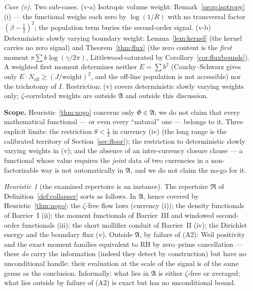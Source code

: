 \documentclass[11pt]{amsart}
\theoremstyle{plain}
\theoremstyle{definition}
\theoremstyle{remark}
\newtheorem{heuristic}[theorem]{Heuristic}
\newcommand{\RH}{\mathrm{RH}}
\begin{document}
\emph{Case \textup{(v)}.} Two sub-cases. \textup{(v-a)} Isotropic volume weight: Remark~\ref{prop:isotropy}(i) --- the functional weighs each zero by $\log(1/R)$ with no transversal factor $(\beta-\tfrac12)^2$; the population term buries the second-order signal. \textup{(v-b)} Deterministic slowly varying boundary weight: Lemma~\ref{lem:kernel} (the kernel carries no zero signal) and Theorem~\ref{thm:flux} (the zero content is the \emph{first} moment $\pi\sum b\log(\gamma/2\pi)$, Littlewood-saturated by Corollary~\ref{cor:fluxbounds}). A weighted first moment determines neither $E=\sum b^2$ (Cauchy--Schwarz gives only $E\cdot N_{\mathrm{off}}\ge(J/\text{weight})^2$, and the off-line population is not accessible) nor the trichotomy of $I$. Restriction: \textup{(v)} covers deterministic slowly varying weights only; $\zeta$-correlated weights are outside $\mathfrak A$ and outside this discussion.

\textbf{Scope.} Heuristic~\ref{thm:nogo} concerns only $\Phi\in\mathfrak A$; we do not claim that every mathematical functional --- or even every ``natural'' one --- belongs to it. Three explicit limits: the restriction $\theta<\tfrac12$ in currency \textup{(iv)} (the long range is the calibrated territory of Section~\ref{sec:floor}); the restriction to deterministic slowly varying weights in \textup{(v)}; and the absence of an inter-currency closure clause --- a functional whose value requires the \emph{joint} data of two currencies in a non-factorizable way is not automatically in $\mathfrak A$, and we do not claim the no-go for it.

\begin{heuristic}[the examined repertoire is an instance]\label{cor:repertoire}
The repertoire $\mathfrak R$ of Definition~\ref{def:collapser} sorts as follows. In $\mathfrak A$, hence covered by Heuristic~\ref{thm:nogo}: the $\zeta$-free flow laws \textup{(}currency \textup{(i)}\textup{)}; the density functionals of Barrier~I \textup{(ii)}; the moment functionals of Barrier~III and windowed second-order functionals \textup{(iii)}; the short mollifier conduit of Barrier~II \textup{(iv)}; the Dirichlet energy and the boundary flux \textup{(v)}. Outside $\mathfrak A$, by failure of \textup{(A2)}: Weil positivity and the exact moment families equivalent to $\RH$ by zero--prime cancellation --- these \emph{do} carry the information \textup{(}indeed they detect by construction\textup{)} but have no unconditional handle: their evaluation at the scale of the signal is of the same genus as the conclusion. Informally: what lies in $\mathfrak A$ is either $\zeta$-free or averaged; what lies outside by failure of \textup{(A2)} is exact but has no unconditional bound.
\end{heuristic}
\end{document}
